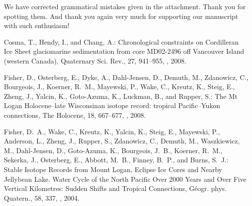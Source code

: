 
We have corrected grammatical mistakes given in the attachment. Thank you for
spotting them. And thank you again very much for supporting our manuscript with
such enthusiasm!


\begin{thebibliography}{69}

Cosma, T., Hendy, I., and Chang, A.: Chronological constraints on Cordilleran
  Ice Sheet glaciomarine sedimentation from core MD02-2496 off Vancouver Island
  (western Canada), Quaternary Sci. Rev., 27, 941--955,
  , 2008.

Fisher, D., Osterberg, E., Dyke, A., Dahl-Jensen, D., Demuth, M., Zdanowicz,
  C., Bourgeois, J., Koerner, R.~M., Mayewski, P., Wake, C., Kreutz, K., Steig,
  E., Zheng, J., Yalcin, K., Goto-Azuma, K., Luckman, B., and Rupper, S.: The
  Mt Logan Holocene--late Wisconsinan isotope record: tropical Pacific--Yukon
  connections, The Holocene, 18, 667--677, ,
  2008.

Fisher, D.~A., Wake, C., Kreutz, K., Yalcin, K., Steig, E., Mayewski, P.,
  Anderson, L., Zheng, J., Rupper, S., Zdanowicz, C., Demuth, M., Waszkiewicz,
  M., Dahl-Jensen, D., Goto-Azuma, K., Bourgeois, J.~B., Koerner, R.~M.,
  Sekerka, J., Osterberg, E., Abbott, M.~B., Finney, B.~P., and Burns, S.~J.:
  Stable Isotope Records from Mount Logan, Eclipse Ice Cores and Nearby
  Jellybean Lake. Water Cycle of the North Pacific Over 2000 Years and Over
  Five Vertical Kilometres: Sudden Shifts and Tropical Connections, G\'{e}ogr.
  phys. Quatern., 58, 337, , 2004.


\end{thebibliography}
